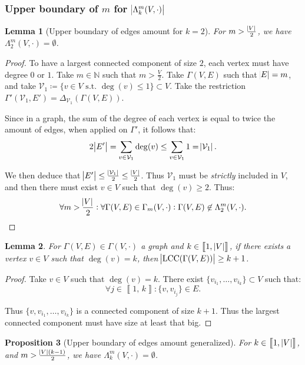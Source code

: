 \documentclass{article}
\newtheorem{lemma}{Lemma}[section]
\newtheorem{proposition}[lemma]{Proposition}
\theoremstyle{definition}
\theoremstyle{remark}
\DeclareMathOperator{\LCC}{LCC}
\newcommand{\N}{\mathbb N}
\newcommand{\intint}[2]{\left\llbracket#1, \, #2\right\rrbracket}
\newcommand{\st}{\text{ s.t. }}
\begin{document}
		\subsubsection{Upper boundary of $m$ for $\abs {\Lambda_k^m(V, \cdot)}$}
			\begin{lemma}[Upper boundary of edges amount for $k=2$]\label{lemma:upper boundary k=2} For $m > \frac {\abs V}2$, we have $\Lambda_2^m(V, \cdot) = \emptyset$.
			\end{lemma}

			\begin{proof} To have a largest connected component of size $2$, each vertex must have degree $0$ or $1$. Take $m \in \N$ such that $m > \frac V2$. Take
			$\Gamma(V, E)$ such that $\abs E = m$, and take $\mathcal V_1 \coloneqq \{v \in V \st \deg(v) \leq 1\} \subset V$. Take the restriction
			$\Gamma'(\mathcal V_1, E') = \Delta_{\mathcal V_1}(\Gamma(V, E))$.

			Since in a graph, the sum of the degree of each vertex is equal to twice the amount of edges, when applied on $\Gamma'$, it follows that:
			\[2\abs {E'} = \sum_{v \in \mathcal V_1}\deg(v) \leq \sum_{v \in \mathcal V_1}1 = \abs {\mathcal V_1}.\]

			We then deduce that $\abs {E'} \leq \frac {\abs {\mathcal V_1}}2 \leq \frac {\abs V}2$. Thus $\mathcal V_1$ must be \textit{strictly} included in $V$,
			and then there must exist $v \in V$ such that $\deg(v) \geq 2$. Thus:
			\[\forall m > \frac {\abs V}2 : \forall \Gamma(V, E) \in \Gamma_m(V, \cdot) : \Gamma(V, E) \not \in \Lambda_2^m(V, \cdot).\]
			\end{proof}

			\begin{lemma} For $\Gamma(V, E) \in \Gamma(V, \cdot)$ a graph and $k \in \intint 1{\abs V}$, if there exists a vertex $v \in V$ such that $\deg(v) = k$,
			then $\abs {\LCC(\Gamma(V, E))} \geq k+1$.
			\end{lemma}

			\begin{proof} Take $v \in V$ such that $\deg(v) = k$. There exist $\{v_{i_1}, \ldots, v_{i_k}\} \subset V$ such that:
			\[\forall j \in \intint 1k : \{v, v_{i_j}\} \in E.\]

			Thus $\{v, v_{i_1}, \ldots, v_{i_k}\}$ is a connected component of size $k+1$. Thus the largest connected component must have size at least that big.
			\end{proof}

			\begin{proposition}[Upper boundary of edges amount generalized] For $k \in \intint 1{\abs V}$, and $m > \frac {\abs V(k-1)}2$, we have $\Lambda_k^m(V, \cdot) = \emptyset$.
			\end{proposition}
\end{document}
